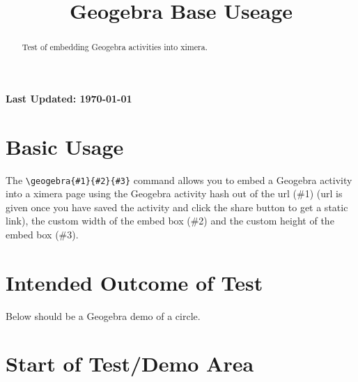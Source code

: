 \documentclass{ximera}
\title{Geogebra Base Useage}
\begin{document}
\begin{abstract}
    Test of embedding Geogebra activities into ximera. 
\end{abstract}
\maketitle

{{\Huge \bfseries Last Updated: \today}} \\


\section{Basic Usage}
The \verb|\geogebra{#1}{#2}{#3}| command allows you to embed a Geogebra activity into a ximera page using the Geogebra activity hash out of the url (\#1)
(url is given once you have saved the activity and click the share button to get a static link), 
the custom width of the embed box (\#2) and the custom height of the embed box (\#3).

\section{Intended Outcome of Test}
Below should be a Geogebra demo of a circle.

\section{Start of Test/Demo Area}

\hrulefill
\end{document}
